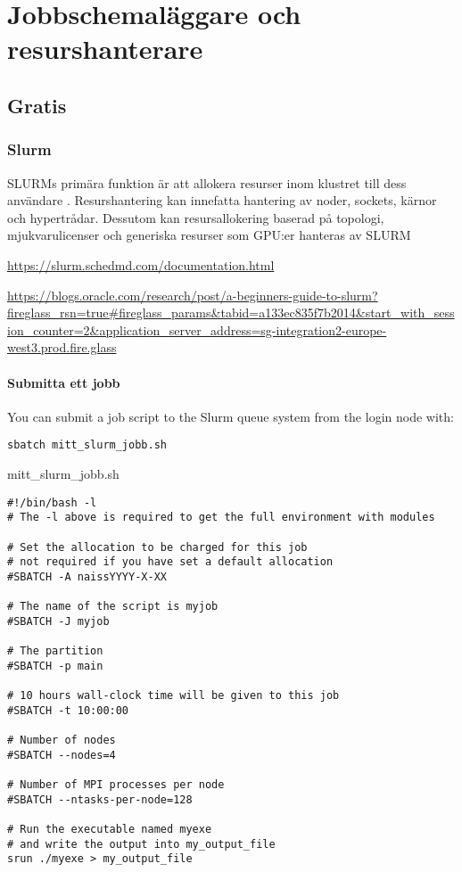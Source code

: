 \documentclass[
  letterpaper,
  DIV=11,
  numbers=noendperiod]{scrreprt}
\begin{document}
\chapter{Jobbschemaläggare och
resurshanterare}\label{jobbschemaluxe4ggare-och-resurshanterare}

\section{Gratis}\label{gratis}

\subsection{Slurm}\label{slurm}

SLURMs primära funktion är att allokera resurser inom klustret till dess
användare . Resurshantering kan innefatta hantering av noder, sockets,
kärnor och hypertrådar. Dessutom kan resursallokering baserad på
topologi, mjukvarulicenser och generiska resurser som GPU:er hanteras av
SLURM

\url{https://slurm.schedmd.com/documentation.html}

\url{https://blogs.oracle.com/research/post/a-beginners-guide-to-slurm?fireglass_rsn=true\#fireglass_params&tabid=a133ec835f7b2014&start_with_session_counter=2&application_server_address=sg-integration2-europe-west3.prod.fire.glass}

\subsubsection{Submitta ett jobb}\label{submitta-ett-jobb}

You can submit a job script to the Slurm queue system from the login
node with:

\begin{verbatim}
sbatch mitt_slurm_jobb.sh
\end{verbatim}

mitt\_slurm\_jobb.sh

\begin{verbatim}
#!/bin/bash -l
# The -l above is required to get the full environment with modules

# Set the allocation to be charged for this job
# not required if you have set a default allocation
#SBATCH -A naissYYYY-X-XX

# The name of the script is myjob
#SBATCH -J myjob

# The partition
#SBATCH -p main

# 10 hours wall-clock time will be given to this job
#SBATCH -t 10:00:00

# Number of nodes
#SBATCH --nodes=4

# Number of MPI processes per node
#SBATCH --ntasks-per-node=128

# Run the executable named myexe
# and write the output into my_output_file
srun ./myexe > my_output_file
\end{verbatim}
\end{document}
